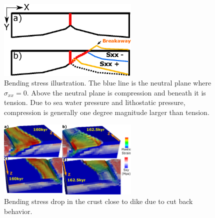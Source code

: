 \begin{figure}[hc]
  \centering
    \includegraphics[width=0.6\textwidth]{fig_Results4_8_sqrt_cut_back_bending_cartoon.eps}
  \caption{Bending stress illustration. The blue line is the neutral plane where $\sigma_{xx}=0$. Above the neutral plane is compression and beneath it is tension. Due to sea water pressure and lithostatic pressure, compression is generally one degree magnitude larger than tension.}
 \label{fig_Results4_8}
\end{figure}

\begin{figure}[hc]
  \centering
    \includegraphics[width=0.6\textwidth]{fig_Results4_6_sqrt_cut_back_bending_drop.eps}
  \caption{Bending stress drop in the crust close to dike due to cut back behavior.}
 \label{fig_Results4_6}
\end{figure}


